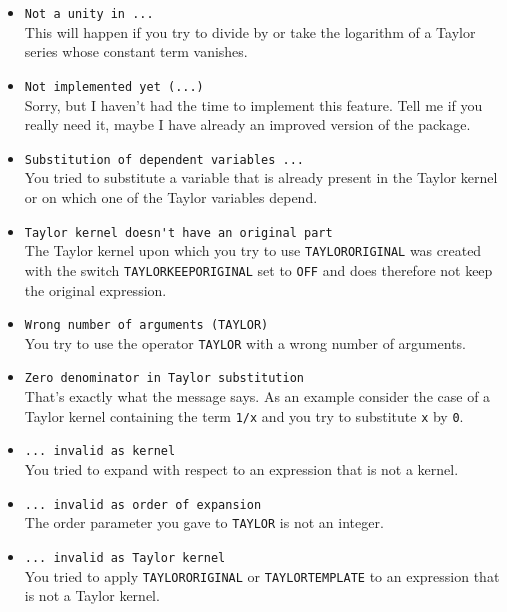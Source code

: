 \begin{itemize}
\item \verb|Not a unity in ...|\\
    This will happen if you try to divide by or take the logarithm of 
    a Taylor series whose constant term vanishes.

\item \verb|Not implemented yet (...)|\\
    Sorry, but I haven't had the time to implement this feature.
    Tell me if you really need it, maybe I have already an improved
    version of the package.

\item \verb|Substitution of dependent variables ...|\\
    You tried to substitute a variable that is already present in the
    Taylor kernel or on which one of the Taylor variables depend.

\item \verb|Taylor kernel doesn't have an original part|\\
    The Taylor kernel upon which you try to use \verb|TAYLORORIGINAL|
    was created with the switch \verb|TAYLORKEEPORIGINAL|
    set to \verb|OFF|
    and does therefore not keep the original expression.

\item \verb|Wrong number of arguments (TAYLOR)|\\
    You try to use the operator \verb|TAYLOR| with a wrong number of
    arguments.

\item \verb|Zero denominator in Taylor substitution|\\
    That's exactly what the message says.  As an example consider the
    case of a Taylor kernel containing the term \verb|1/x| and you try
    to substitute \verb|x| by \verb|0|.

\item \verb|... invalid as kernel|\\
    You tried to expand with respect to an expression that is not a
    kernel.

\item \verb|... invalid as order of expansion|\\
    The order parameter you gave to \verb|TAYLOR| is not an integer.

\item \verb|... invalid as Taylor kernel|\\
    You tried to apply \verb|TAYLORORIGINAL| or \verb|TAYLORTEMPLATE|
    to an expression that is not a Taylor kernel.


\end{itemize}
